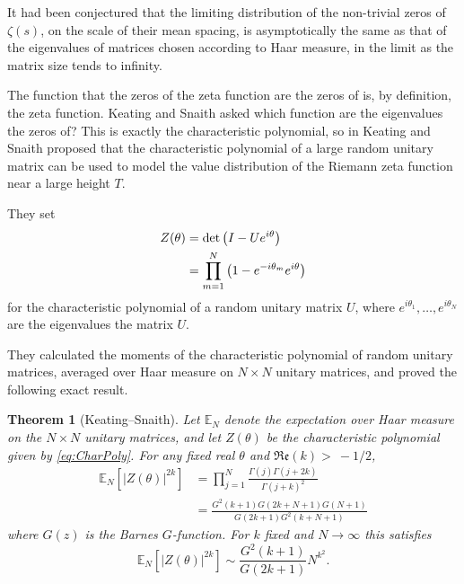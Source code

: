 \documentclass[12pt,a4paper,reqno]{amsart}
\newtheorem{theorem}{Theorem}
\theoremstyle{remark}
\numberwithin{equation}{section}
\renewcommand{\Re}{\mathfrak{Re}}
\newcommand{\E}{\mathbb{E}}
\begin{document}
It had been conjectured that the limiting distribution of the non-trivial zeros of $\zeta (s)$, on the scale of their mean spacing, is asymptotically the same as that of the eigenvalues of matrices chosen according to Haar measure, in the limit as the matrix size tends to infinity.

The function that the zeros of the zeta function are the zeros of is, by definition, the zeta function. Keating and Snaith asked which function are the eigenvalues the zeros of? This is exactly the characteristic polynomial, so in \cite{KS00a} Keating and Snaith proposed that the characteristic polynomial of a large random unitary matrix can be used to model the value distribution of the Riemann zeta function near a large height $T$.

They set
\begin{align}
Z(\theta) &= \det\left(I-U e^{i\theta}\right) \notag\\
&=\prod_{m=1}^N \left(1-e^{-i\theta_m} e^{i\theta} \right) \label{eq:CharPoly}
\end{align}
for the characteristic polynomial of a random unitary matrix $U$, where $e^{i\theta_1},\dots,e^{i\theta_N}$ are the eigenvalues the matrix $U$.

They calculated the moments of the characteristic polynomial of random unitary matrices, averaged over Haar measure on $N\times N$ unitary matrices, and proved the following exact result.
\begin{theorem}[Keating--Snaith]
Let $\E_N$ denote the expectation over Haar measure on the $N\times N$ unitary matrices, and let $Z(\theta)$ be the characteristic polynomial given by \eqref{eq:CharPoly}. For any fixed real $\theta$ and $\Re(k)>~-1/2$,
\begin{align*}
\E_N\left[ \left|Z(\theta)\right|^{2k} \right] &= \prod_{j=1}^N \frac{\Gamma(j) \Gamma(j+2k)}{\Gamma(j+k)^2}\\
&=  \frac{G^2(k+1) G(2k+N+1) G(N+1)}{G(2k+1) G^2(k+N+1)}
\end{align*}
where $G(z)$ is the Barnes $G$-function. For $k$ fixed and $N\to\infty$ this satisfies
\[
\E_N\left[ \left|Z(\theta)\right|^{2k} \right] \sim \frac{G^2(k+1)}{G(2k+1)} N^{k^2}.
\]
\end{theorem}
\end{document}
